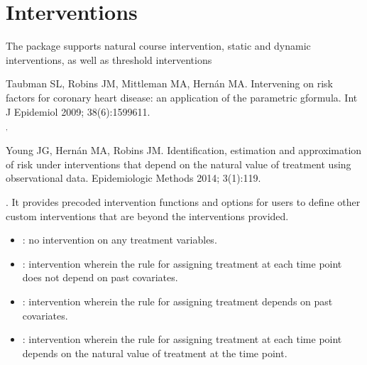\documentclass[letterpaper,10pt,english]{sphinxmanual}
\begin{document}
\section{Interventions}
\label{\detokenize{Specifications/Interventions:interventions}}\label{\detokenize{Specifications/Interventions:id1}}\label{\detokenize{Specifications/Interventions::doc}}
\sphinxAtStartPar
The package supports natural course intervention, static and dynamic interventions, as well as
threshold interventions \sphinxstepexplicit %
\begin{footnote}[1]\label{\thesphinxscope.1}%
\sphinxAtStartFootnote
Taubman SL, Robins JM, Mittleman MA, Hernán MA. Intervening on risk factors for coronary heart disease: an
application of the parametric g\sphinxhyphen{}formula. Int J Epidemiol 2009; 38(6):1599\sphinxhyphen{}611.
%
\end{footnote} $^{\text{,}}$ \sphinxstepexplicit %
\begin{footnote}[2]\label{\thesphinxscope.2}%
\sphinxAtStartFootnote
Young JG, Hernán MA, Robins JM. Identification, estimation and approximation of risk under interventions that
depend on the natural value of treatment using observational data. Epidemiologic Methods 2014; 3(1):1\sphinxhyphen{}19.
%
\end{footnote} . It provides pre\sphinxhyphen{}coded intervention functions and options for users
to define other custom interventions that are beyond the interventions
provided.
\begin{itemize}
\item {} 
\sphinxAtStartPar
{}: no intervention on any treatment variables.

\item {} 
\sphinxAtStartPar
{}:  intervention wherein the rule for assigning treatment at each time point does not depend on past covariates.

\item {} 
\sphinxAtStartPar
{}: intervention wherein the rule for assigning treatment depends on past covariates.

\item {} 
\sphinxAtStartPar
{}: intervention wherein the rule for assigning treatment at each time point depends on the natural value of treatment at the time point.

\end{itemize}
\end{document}
